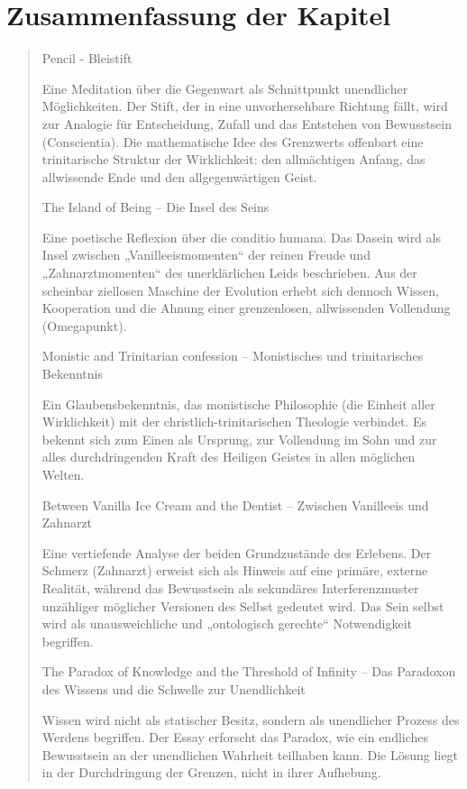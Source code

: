 \documentclass[
  ngerman,
]{article}
\begin{document}
\section{\texorpdfstring{\textbf{Zusammenfassung der
Kapitel}}{Zusammenfassung der Kapitel}}\label{zusammenfassung-der-kapitel}

\begin{quote}
Pencil - Bleistift

Eine Meditation über die Gegenwart als Schnittpunkt unendlicher
Möglichkeiten. Der Stift, der in eine unvorhersehbare Richtung fällt,
wird zur Analogie für Entscheidung, Zufall und das Entstehen von
Bewusstsein (Conscientia). Die mathematische Idee des Grenzwerts
offenbart eine trinitarische Struktur der Wirklichkeit: den allmächtigen
Anfang, das allwissende Ende und den allgegenwärtigen Geist.

The Island of Being -- Die Insel des Seins

Eine poetische Reflexion über die conditio humana. Das Dasein wird als
Insel zwischen „Vanilleeismomenten`` der reinen Freude und
„Zahnarztmomenten`` des unerklärlichen Leids beschrieben. Aus der
scheinbar ziellosen Maschine der Evolution erhebt sich dennoch Wissen,
Kooperation und die Ahnung einer grenzenlosen, allwissenden Vollendung
(Omegapunkt).

Monistic and Trinitarian confession -- Monistisches und trinitarisches
Bekenntnis

Ein Glaubensbekenntnis, das monistische Philosophie (die Einheit aller
Wirklichkeit) mit der christlich-trinitarischen Theologie verbindet. Es
bekennt sich zum Einen als Ursprung, zur Vollendung im Sohn und zur
alles durchdringenden Kraft des Heiligen Geistes in allen möglichen
Welten.

Between Vanilla Ice Cream and the Dentist -- Zwischen Vanilleeis und
Zahnarzt

Eine vertiefende Analyse der beiden Grundzustände des Erlebens. Der
Schmerz (Zahnarzt) erweist sich als Hinweis auf eine primäre, externe
Realität, während das Bewusstsein als sekundäres Interferenzmuster
unzähliger möglicher Versionen des Selbst gedeutet wird. Das Sein selbst
wird als unausweichliche und „ontologisch gerechte`` Notwendigkeit
begriffen.

The Paradox of Knowledge and the Threshold of Infinity -- Das Paradoxon
des Wissens und die Schwelle zur Unendlichkeit

Wissen wird nicht als statischer Besitz, sondern als unendlicher Prozess
des Werdens begriffen. Der Essay erforscht das Paradox, wie ein
endliches Bewusstsein an der unendlichen Wahrheit teilhaben kann. Die
Lösung liegt in der Durchdringung der Grenzen, nicht in ihrer Aufhebung.


\end{quote}
\end{document}
